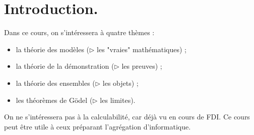 \documentclass[./main]{subfiles}
\begin{document}
  \chapter*{Introduction.} 

  Dans ce cours, on s'intéressera à quatre thèmes :
  \begin{itemize}
    \item la théorie des modèles ($\triangleright$ les "vraies" mathématiques) ;
    \item la théorie de la démonstration ($\triangleright$ les preuves) ;
    \item la théorie des ensembles ($\triangleright$ les objets) ;
    \item les théorèmes de Gödel ($\triangleright$ les limites).
  \end{itemize}
  On ne s'intéressera pas à la calculabilité, car déjà vu en cours de FDI.
  Ce cours peut être utile à ceux préparant l'agrégation d'informatique.
\end{document}
